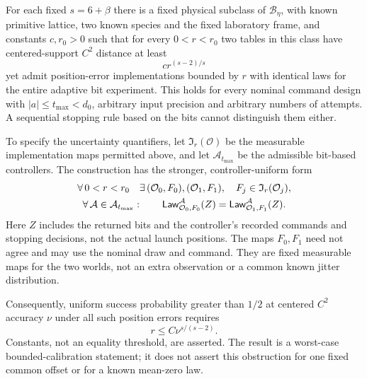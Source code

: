 \begin{theorem}
\label{thm:calibration-floor}
For each fixed $s=6+\beta$ there is a fixed physical subclass of
$\mathcal B_\eta$, with known primitive lattice, two known species
and the fixed laboratory frame, and constants $c,r_0>0$ such that
for every $0<r<r_0$ two tables in this class have centered-support
$C^2$ distance at least
\begin{equation}\label{eq:calibration-separation}
                            c r^{(s-2)/s}
\end{equation}
yet admit position-error implementations bounded by $r$ with identical
laws for the entire adaptive bit experiment. This holds for every
nominal command design with $|a|\le t_{\max}<d_0$, arbitrary input
precision and arbitrary numbers of attempts. A sequential stopping
rule based on the bits cannot distinguish them either.

To specify the uncertainty quantifiers, let $\mathfrak I_r(\mathcal O)$
be the measurable implementation maps permitted above, and let
$\mathcal A_{t_{\max}}$ be the admissible bit-based controllers. The
construction has the stronger, controller-uniform form
\begin{gather}\label{eq:calibration-quantifiers}
 \forall\,0<r<r_0\quad
 \exists\,(\mathcal O_0,F_0),(\mathcal O_1,F_1),\quad
             F_j\in\mathfrak I_r(\mathcal O_j),\notag\\
 \forall\,\mathcal A\in\mathcal A_{t_{\max}}:\qquad
 \mathsf{Law}_{\mathcal O_0,F_0}^{\mathcal A}(Z)
       =\mathsf{Law}_{\mathcal O_1,F_1}^{\mathcal A}(Z).
\end{gather}
Here $Z$ includes the returned bits and the controller's recorded
commands and stopping decisions, not the actual launch positions.
The maps $F_0,F_1$ need not agree and may use the nominal draw and
command. They are fixed measurable maps for the two worlds, not an
extra observation or a common known jitter distribution.

Consequently, uniform success probability greater than $1/2$ at
centered $C^2$ accuracy $\nu$ under all such position errors requires
\begin{equation}\label{eq:calibration-necessary}
                            r\le C\nu^{s/(s-2)}.
\end{equation}
Constants, not an equality threshold, are asserted. The result is a
worst-case bounded-calibration statement; it does not assert this
obstruction for one fixed common offset or for a known mean-zero law.
\end{theorem}

